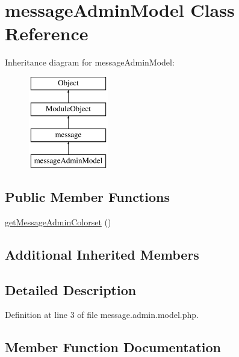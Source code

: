 \hypertarget{classmessageAdminModel}{}\section{message\+Admin\+Model Class Reference}
\label{classmessageAdminModel}
Inheritance diagram for message\+Admin\+Model\+:\begin{figure}[H]
\begin{center}
\leavevmode
\includegraphics[height=4.000000cm]{classmessageAdminModel}
\end{center}
\end{figure}
\subsection*{Public Member Functions}
\begin{DoxyCompactItemize}
\item 
\hyperlink{classmessageAdminModel_a97194ea5740d5de8b20b63c3c0bd9b90}{get\+Message\+Admin\+Colorset} ()
\end{DoxyCompactItemize}
\subsection*{Additional Inherited Members}


\subsection{Detailed Description}


Definition at line 3 of file message.\+admin.\+model.\+php.



\subsection{Member Function Documentation}
\mbox{\label{classmessageAdminModel_a97194ea5740d5de8b20b63c3c0bd9b90}} 
